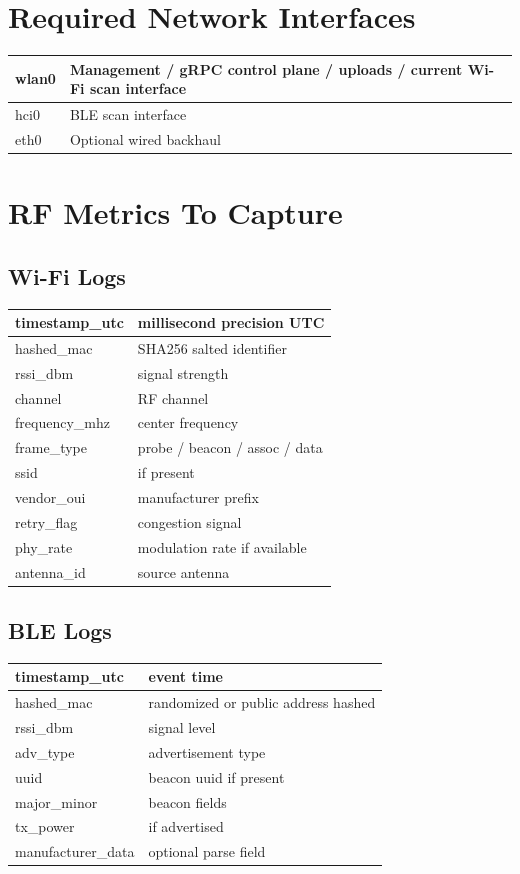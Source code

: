\documentclass[11pt,a4paper]{article}
\begin{document}
\section{Required Network Interfaces}

\begin{longtable}{|p{4cm}|p{10cm}|}
\hline
wlan0 & Management / gRPC control plane / uploads / current Wi-Fi scan interface \\
\hline
hci0 & BLE scan interface \\
\hline
eth0 & Optional wired backhaul \\
\hline
\end{longtable}

\section{RF Metrics To Capture}

\subsection{Wi-Fi Logs}

\begin{longtable}{|p{5cm}|p{8cm}|}
\hline
timestamp\_utc & millisecond precision UTC \\
\hline
hashed\_mac & SHA256 salted identifier \\
\hline
rssi\_dbm & signal strength \\
\hline
channel & RF channel \\
\hline
frequency\_mhz & center frequency \\
\hline
frame\_type & probe / beacon / assoc / data \\
\hline
ssid & if present \\
\hline
vendor\_oui & manufacturer prefix \\
\hline
retry\_flag & congestion signal \\
\hline
phy\_rate & modulation rate if available \\
\hline
antenna\_id & source antenna \\
\hline
\end{longtable}

\subsection{BLE Logs}

\begin{longtable}{|p{5cm}|p{8cm}|}
\hline
timestamp\_utc & event time \\
\hline
hashed\_mac & randomized or public address hashed \\
\hline
rssi\_dbm & signal level \\
\hline
adv\_type & advertisement type \\
\hline
uuid & beacon uuid if present \\
\hline
major\_minor & beacon fields \\
\hline
tx\_power & if advertised \\
\hline
manufacturer\_data & optional parse field \\
\hline
\end{longtable}
\end{document}
